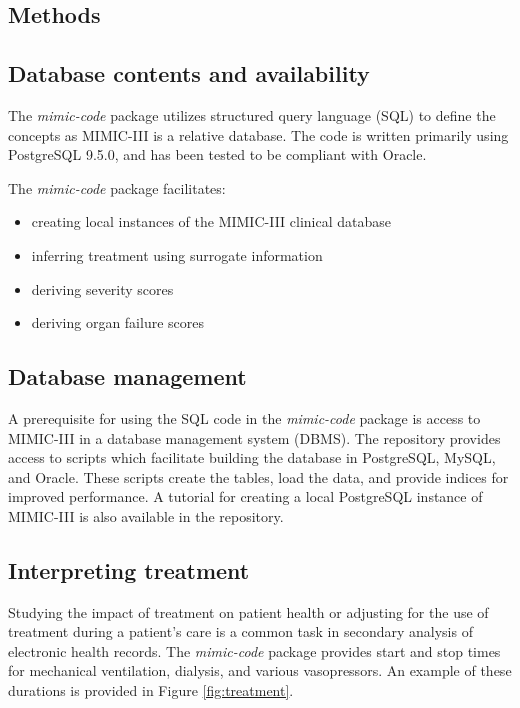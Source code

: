 \documentclass{bioinfo}
\begin{document}
\begin{methods}
\section{Methods}

\subsection{Database contents and availability}


The \emph{mimic-code} package utilizes structured query language (SQL) to define the concepts as MIMIC-III  is a relative database. The code is written primarily using PostgreSQL 9.5.0, and has been tested to be compliant with Oracle.

The \emph{mimic-code} package facilitates:

\begin{itemize}
\item creating local instances of the MIMIC-III clinical database
\item inferring treatment using surrogate information
\item deriving severity scores
\item deriving organ failure scores
\end{itemize}

\subsection{Database management}

A prerequisite for using the SQL code in the \emph{mimic-code} package is access to MIMIC-III in a database management system (DBMS). The repository provides access to scripts which facilitate building the database in PostgreSQL, MySQL, and Oracle. These scripts create the tables, load the data, and provide indices for improved performance. A tutorial for creating a local PostgreSQL instance of MIMIC-III is also available in the repository.

\subsection{Interpreting treatment}

Studying the impact of treatment on patient health or adjusting for the use of treatment during a patient's care is a common task in secondary analysis of electronic health records. The \emph{mimic-code} package provides start and stop times for mechanical ventilation, dialysis, and various vasopressors. An example of these durations is provided in Figure \ref{fig:treatment}.


\end{methods}
\end{document}
